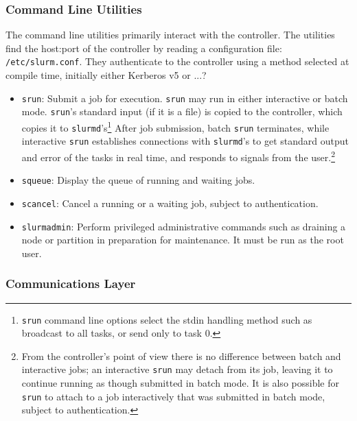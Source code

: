 \subsubsection{Command Line Utilities}

The command line utilities primarily interact with the controller.
The utilities find the host:port of the controller by reading a configuration 
file: {\tt /etc/slurm.conf}.
They authenticate to the controller using a method selected at compile
time, initially either Kerberos v5 or ...?


\begin{itemize}
\item {\tt srun}: Submit a job for execution.  {\tt srun} may run in either
interactive or batch mode.  {\tt srun}'s standard input (if it is a file) is 
copied to the controller, which copies it to {\tt slurmd}'s\footnote{{\tt srun}
command line options select the stdin handling method such as broadcast to 
all tasks, or send only to task 0.}
After job submission, batch {\tt srun} terminates, while interactive 
{\tt srun} establishes connections with {\tt slurmd}'s to get standard output 
and error of the tasks in real time, and responds to signals from the 
user.\footnote{From the controller's point of view there is no difference 
between batch and interactive jobs;  an interactive {\tt srun} may detach from 
its job, leaving it to continue running as though submitted in batch mode.
It is also possible for {\tt srun} to attach to a job interactively that
was submitted in batch mode, subject to authentication.}

\item {\tt squeue}: Display the queue of running and waiting jobs.

\item {\tt scancel}: Cancel a running or a waiting job, subject to
authentication.

\item {\tt slurmadmin}: Perform privileged administrative commands
such as draining a node or partition in preparation for maintenance. 
It must be run as the root user.

\end{itemize}

\subsubsection{Communications Layer}

